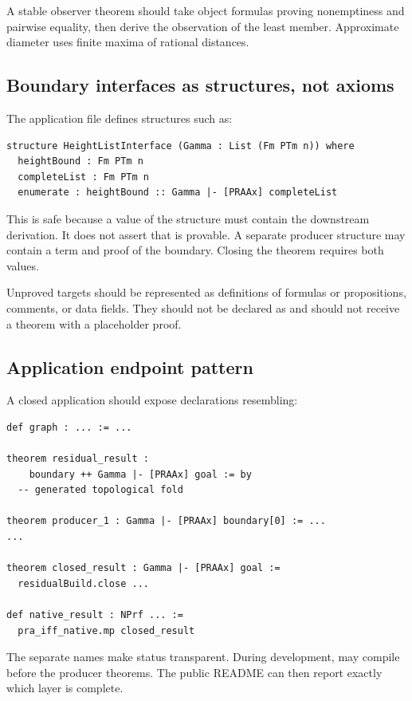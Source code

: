 A stable observer theorem should take object formulas proving nonemptiness and pairwise equality, then derive the observation of the least member.  Approximate diameter uses finite maxima of rational distances.

\subsection{Boundary interfaces as structures, not axioms}

The application file defines structures such as:

\begin{lstlisting}
structure HeightListInterface (Gamma : List (Fm PTm n)) where
  heightBound : Fm PTm n
  completeList : Fm PTm n
  enumerate : heightBound :: Gamma |- [PRAAx] completeList
\end{lstlisting}

This is safe because a value of the structure must contain the downstream derivation.  It does not assert that  is provable.  A separate producer structure may contain a term and proof of the boundary.  Closing the theorem requires both values.

Unproved targets should be represented as definitions of formulas or propositions, comments, or data fields.  They should not be declared as  and should not receive a theorem with a placeholder proof.

\subsection{Application endpoint pattern}

A closed application should expose declarations resembling:

\begin{lstlisting}
def graph : ... := ...

theorem residual_result :
    boundary ++ Gamma |- [PRAAx] goal := by
  -- generated topological fold

theorem producer_1 : Gamma |- [PRAAx] boundary[0] := ...
...

theorem closed_result : Gamma |- [PRAAx] goal :=
  residualBuild.close ...

def native_result : NPrf ... :=
  pra_iff_native.mp closed_result
\end{lstlisting}

The separate names make status transparent.  During development,  may compile before the producer theorems.  The public README can then report exactly which layer is complete.

